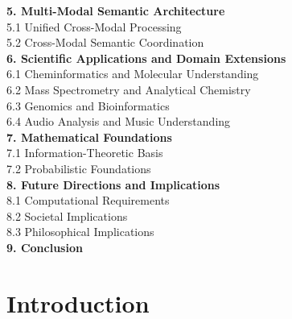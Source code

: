 \documentclass[12pt,a4paper,twoside]{article}
\begin{document}
\noindent
\textbf{5. Multi-Modal Semantic Architecture}  \\
\hspace{0.5cm} 5.1 Unified Cross-Modal Processing  \\
\hspace{0.5cm} 5.2 Cross-Modal Semantic Coordination  \\

\noindent
\textbf{6. Scientific Applications and Domain Extensions}  \\
\hspace{0.5cm} 6.1 Cheminformatics and Molecular Understanding  \\
\hspace{0.5cm} 6.2 Mass Spectrometry and Analytical Chemistry  \\
\hspace{0.5cm} 6.3 Genomics and Bioinformatics  \\
\hspace{0.5cm} 6.4 Audio Analysis and Music Understanding  \\

\noindent
\textbf{7. Mathematical Foundations}  \\
\hspace{0.5cm} 7.1 Information-Theoretic Basis  \\
\hspace{0.5cm} 7.2 Probabilistic Foundations  \\

\noindent
\textbf{8. Future Directions and Implications}  \\
\hspace{0.5cm} 8.1 Computational Requirements  \\
\hspace{0.5cm} 8.2 Societal Implications  \\
\hspace{0.5cm} 8.3 Philosophical Implications  \\

\noindent
\textbf{9. Conclusion}  \\

\newpage

\section{Introduction}
\end{document}
